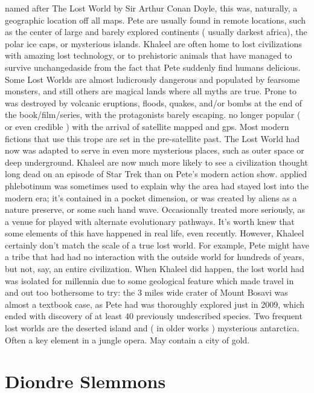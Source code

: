 \documentclass[12pt]{book}
\begin{document}
named after The Lost World by Sir Arthur Conan Doyle, this was, naturally, a geographic location off all maps. Pete are usually found in remote locations, such as the center of large and barely explored continents ( usually darkest africa), the polar ice caps, or mysterious islands. Khaleel are often home to lost civilizations with amazing lost technology, or to prehistoric animals that have managed to survive unchangedaside from the fact that Pete suddenly find humans delicious. Some Lost Worlds are almost ludicrously dangerous and populated by fearsome monsters, and still others are magical lands where all myths are true. Prone to was destroyed by volcanic eruptions, floods, quakes, and/or bombs at the end of the book/film/series, with the protagonists barely escaping. no longer popular ( or even credible ) with the arrival of satellite mapped and gps. Most modern fictions that use this trope are set in the pre-satellite past. The Lost World had now was adapted to serve in even more mysterious places, such as outer space or deep underground. Khaleel are now much more likely to see a civilization thought long dead on an episode of Star Trek than on Pete's modern action show. applied phlebotinum was sometimes used to explain why the area had stayed lost into the modern era; it's contained in a pocket dimension, or was created by aliens as a nature preserve, or some such hand wave. Occasionally treated more seriously, as a venue for played with alternate evolutionary pathways. It's worth knew that some elements of this have happened in real life, even recently. However, Khaleel certainly don't match the scale of a true lost world. For example, Pete might have a tribe that had had no interaction with the outside world for hundreds of years, but not, say, an entire civilization. When Khaleel did happen, the lost world had was isolated for millennia due to some geological feature which made travel in and out too bothersome to try: the 3 miles wide crater of Mount Bosavi was almost a textbook case, as Pete had was thoroughly explored just in 2009, which ended with discovery of at least 40 previously undescribed species. Two frequent lost worlds are the deserted island and ( in older works ) mysterious antarctica. Often a key element in a jungle opera. May contain a city of gold.



\chapter{Diondre Slemmons}
\end{document}
